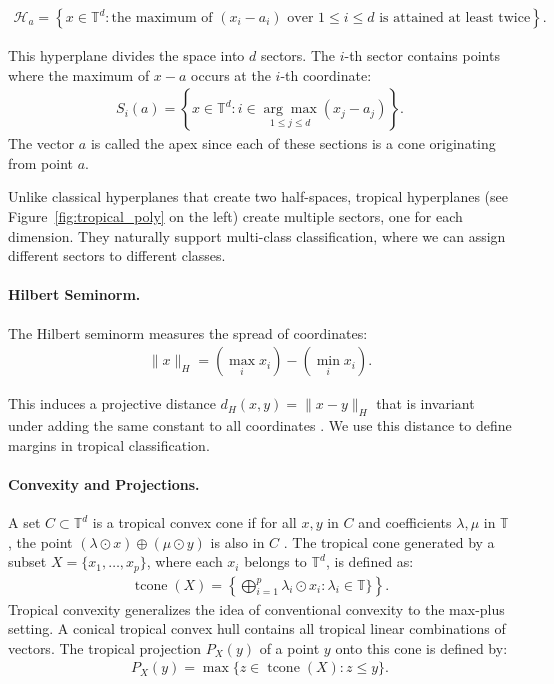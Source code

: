 \documentclass{article}
\newcommand{\tcone}{\operatorname{tcone}}
\renewcommand{\leq}{\leqslant}
\newcommand{\trop}{\mathbb{T}}
\begin{document}
\begin{align}
\mathcal{H}_a = \left\{ x \in \trop^d : \text{the maximum of }(x_i - a_i)\text{ over $1\leq i\leq d$ is attained at least twice} \right\}.
\end{align}

This hyperplane divides the space into $d$ sectors. The $i$-th sector contains points where the maximum of $x - a$ occurs at the $i$-th coordinate:
\begin{align}
S_i(a) = \left\{x \in \trop^d : i \in \underset{1\leq j\leq d}{\arg\max} (x_j - a_j)\right\}.
\end{align}
The vector $a$ is called the apex since 
each of these sections is a cone
originating from point $a$.

Unlike classical hyperplanes that create two half-spaces, tropical hyperplanes (see Figure~\ref{fig:tropical_poly} on the left) create multiple sectors, one for each dimension. They naturally support multi-class classification, where we can assign different sectors to different classes.

\paragraph{Hilbert Seminorm.}
The Hilbert seminorm measures the spread of coordinates:
\begin{align}
\|x\|_H = \left(\max_i x_i\right) - \left(\min_i x_i\right).
\end{align}

This induces a projective distance $d_H(x,y) = \|x - y\|_H$ that is invariant under adding the same constant to all coordinates \cite{cohen2004}. We use this distance to define margins in tropical classification.

\paragraph{Convexity and Projections.}
A set $C \subset \trop^d$ is a tropical convex cone if for all $x,y$ in $C$ and coefficients $\lambda,\mu$ in $\trop$,
the point $(\lambda \odot x) \oplus (\mu \odot y)$ is also in $C$ \cite{cohen2004,develin2004}.
The tropical cone generated by a subset $X=\{x_1,\ldots,x_p\}$, where
each $x_i$ belongs to $\trop^d$, is defined as:
\begin{align}
  \tcone(X) = \left\{\bigoplus_{i=1}^p \lambda_i \odot x_i : \lambda_i \in \trop\} \right\}.\label{e-def-tcone}
\end{align}
Tropical convexity generalizes the idea of conventional convexity to the max-plus setting. A conical tropical convex hull contains all tropical linear combinations of vectors. 
The tropical projection $P_X(y)$ of a point $y$ onto this cone is
defined by:
\begin{align}
P_X(y) = \max\{z \in \tcone(X) : z \leq y\}\label{e-canonical}.
\end{align}
\end{document}
